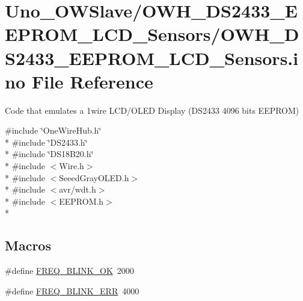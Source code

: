 \hypertarget{OWH__DS2433__EEPROM__LCD__Sensors_8ino}{\section{Uno\-\_\-\-O\-W\-Slave/\-O\-W\-H\-\_\-\-D\-S2433\-\_\-\-E\-E\-P\-R\-O\-M\-\_\-\-L\-C\-D\-\_\-\-Sensors/\-O\-W\-H\-\_\-\-D\-S2433\-\_\-\-E\-E\-P\-R\-O\-M\-\_\-\-L\-C\-D\-\_\-\-Sensors.ino File Reference}
\label{OWH__DS2433__EEPROM__LCD__Sensors_8ino}
}


Code that emulates a 1wire L\-C\-D/\-O\-L\-E\-D Display (D\-S2433 4096 bits E\-E\-P\-R\-O\-M)  


{\ttfamily \#include \char`\"{}One\-Wire\-Hub.\-h\char`\"{}}\\*
{\ttfamily \#include \char`\"{}D\-S2433.\-h\char`\"{}}\\*
{\ttfamily \#include \char`\"{}D\-S18\-B20.\-h\char`\"{}}\\*
{\ttfamily \#include $<$Wire.\-h$>$}\\*
{\ttfamily \#include $<$Seeed\-Gray\-O\-L\-E\-D.\-h$>$}\\*
{\ttfamily \#include $<$avr/wdt.\-h$>$}\\*
{\ttfamily \#include $<$E\-E\-P\-R\-O\-M.\-h$>$}\\*
\subsection*{Macros}
\begin{DoxyCompactItemize}
\item 
\#define \hyperlink{OWH__DS2433__EEPROM__LCD__Sensors_8ino_a9599efa23e764c5668c6a8ee51c8228e}{F\-R\-E\-Q\-\_\-\-B\-L\-I\-N\-K\-\_\-\-O\-K}~2000
\item 
\#define \hyperlink{OWH__DS2433__EEPROM__LCD__Sensors_8ino_afcca8b19968c1fe4a177d898c82b3cf5}{F\-R\-E\-Q\-\_\-\-B\-L\-I\-N\-K\-\_\-\-E\-R\-R}~4000
\end{DoxyCompactItemize}
